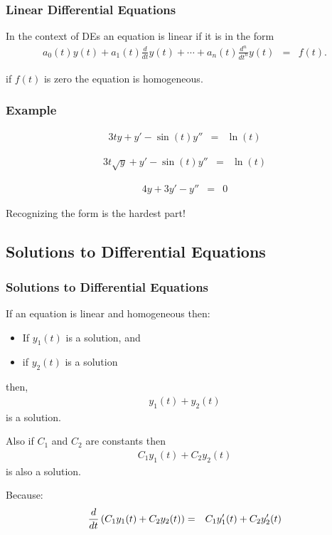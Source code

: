 \begin{frame}
  \frametitle{Linear Differential Equations}

  In the context of DEs an equation is linear if it is in the form 
  \begin{eqnarray*}
    a_0(t) y(t) + a_1(t) \frac{d}{dt}y(t) + \cdots +
    a_n(t) \frac{d^n}{dt^n}y(t) & = & f(t).
  \end{eqnarray*}

  if $f(t)$ is zero the equation is homogeneous.

\end{frame}


\begin{frame}
  \frametitle{Example}

  \vspace*{-3em}
  \begin{eqnarray*}
    3t y + y' - \sin(t) y'' & = & \ln(t)
  \end{eqnarray*}
  \centerline{}

  \begin{eqnarray*}
    3t \sqrt{y} + y' - \sin(t) y'' & = & \ln(t)
  \end{eqnarray*}
  \centerline{}

  \begin{eqnarray*}
    4 y + 3 y' -  y'' & = & 0
  \end{eqnarray*}
  \centerline{}

  Recognizing the form is the hardest part!

\end{frame}

\subsection{Solutions to Differential Equations}

\begin{frame}
  \frametitle{Solutions to Differential Equations}

  If an equation is linear and homogeneous then:
  \begin{itemize}
  \item If $y_1(t)$ is a solution, and
  \item if $y_2(t)$ is a solution
  \end{itemize}

  then, 
  \begin{eqnarray*}
    y_1(t) + y_2(t)
  \end{eqnarray*}
  is a solution.

  Also if $C_1$ and $C_2$ are constants then
  \begin{eqnarray*}
    C_1 y_1(t) + C_2 y_2(t)
  \end{eqnarray*}
  is also a solution.

  Because:
  \begin{eqnarray*}
    \frac{d}{dt} \left( C_1 y_1(t) + C_2 y_2(t) \right) & = & 
    C_1 y_1'(t) + C_2 y_2'(t)
  \end{eqnarray*}


\end{frame}


